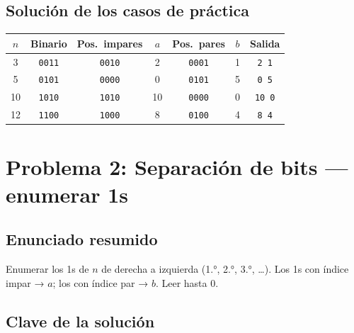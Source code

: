 \documentclass[12pt, oneside]{article}
\begin{document}
\subsection{Solución de los casos de práctica}

\begin{center}
\begin{tabular}{ccccccc}
  \toprule
  $n$ & Binario & Pos.\ impares & $a$ & Pos.\ pares & $b$ & Salida \\
  \midrule
   3 & \texttt{0011} & \texttt{0010} & 2 & \texttt{0001} & 1 & \texttt{2 1} \\
   5 & \texttt{0101} & \texttt{0000} & 0 & \texttt{0101} & 5 & \texttt{0 5} \\
  10 & \texttt{1010} & \texttt{1010} & 10 & \texttt{0000} & 0 & \texttt{10 0} \\
  12 & \texttt{1100} & \texttt{1000} & 8 & \texttt{0100} & 4 & \texttt{8 4} \\
  \bottomrule
\end{tabular}
\end{center}

\newpage

\section{Problema 2: Separación de bits — enumerar 1s}

\subsection{Enunciado resumido}

Enumerar los 1s de $n$ de derecha a izquierda (1.°, 2.°, 3.°, \ldots).
Los 1s con índice impar → $a$; los con índice par → $b$.  Leer hasta 0.

\subsection{Clave de la solución}
\end{document}
